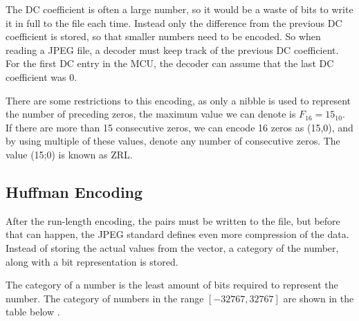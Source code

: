 \begin{infobox}
The DC coefficient is often a large number, so it would be a waste of bits to write it in full to the file each time.
Instead only the difference from the previous DC coefficient is stored, so that smaller numbers need to be encoded.
So when reading a JPEG file, a decoder must keep track of the previous DC coefficient.
For the first DC entry in the MCU, the decoder can assume that the last DC coefficient was 0.

There are some restrictions to this encoding, as only a nibble is used to represent the number of preceding zeros, the maximum value we can denote is $F_{16}=15_{10}$.
If there are more than 15 consecutive zeros, we can encode 16 zeros as (15,0), and by using multiple of these values, denote any number of consecutive zeros.
The value (15;0) is known as ZRL. 

\vspace{4mm}
\subsection{Huffman Encoding}
\vspace{-2.5mm}
After the run-length encoding, the pairs must be written to the file, but before that can happen, the JPEG standard defines even more compression of the data.
Instead of storing the actual values from the vector, a category of the number, along with a bit representation is stored. 

The category of a number is the least amount of bits required to represent the number.
The category of numbers in the range $[-32767, 32767]$ are shown in the table below \citep{RussianDude}.

\begin{centering}
\end{centering}


\end{infobox}
